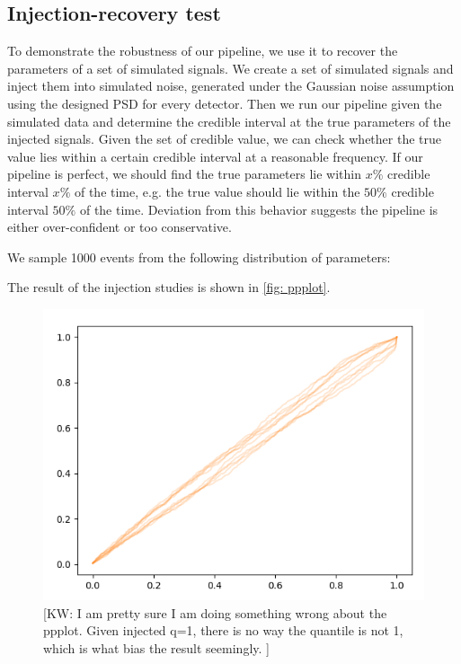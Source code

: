 \documentclass[twocolumn]{aastex631}
\newcommand{\kw}[1]{{\color{rb4}[KW: #1 ]}}
\begin{document}
\subsection{Injection-recovery test}

To demonstrate the robustness of our pipeline, we use it to recover the
parameters of a set of simulated signals. We create a set of simulated signals
and inject them into simulated noise, generated under the Gaussian noise
assumption using the designed PSD for every detector. Then we run our pipeline
given the simulated data and determine the credible interval at the true
parameters of the injected signals. Given the set of credible value, we can
check whether the true value lies within a certain credible interval at a
reasonable frequency. If our pipeline is perfect, we should find the true
parameters lie within $x\%$ credible interval $x\%$ of the time, e.g. the true
value should lie within the $50\%$ credible interval $50\%$ of the time.
Deviation from this behavior suggests the pipeline is either over-confident or
too conservative.

We sample 1000 events from the following distribution of parameters:


The result of the injection studies is shown in \ref{fig: ppplot}.

\begin{figure}
    \includegraphics[width=0.99\linewidth]{static/ppplot.png}
    \caption{ \kw{I am pretty sure I am doing something wrong about the ppplot.
        Given injected q=1, there is no way the quantile is not 1, which is what
        bias the result seemingly.} }
    \label{fig:ppplot}
    \end{figure}
\end{document}
